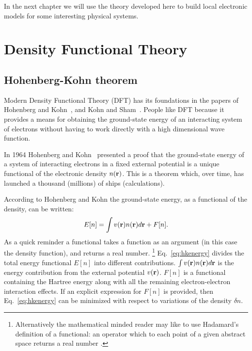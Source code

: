 In the next chapter we will use the theory developed here
to build local electronic models for some interesting 
physical systems.

\section{Density Functional Theory}
\subsection{Hohenberg-Kohn theorem}
\label{sec:hohnkohn}
Modern Density Functional Theory (DFT) has its foundations in the 
papers of Hohenberg and Kohn~\cite{hohenbergkohn64}, and Kohn and Sham~\cite{kohnsham65}.
People like DFT because it provides a means for obtaining the ground-state energy of an
interacting system of electrons without having to work directly with a high dimensional
wave function.

In 1964 Hohenberg and Kohn~\cite{hohenbergkohn64} presented a proof 
that the ground-state energy of a system of interacting electrons
in a fixed external potential is a unique functional of the 
electronic density $n({\bf r})$. This is a theorem which, over time,
has launched a thousand (millions) of ships (calculations).

According to Hohenberg and Kohn the ground-state energy, as a 
functional of the density, can be written:
%
\begin{equation}
\label{eq:hkenergy}
E[n] = \int v({\bf r}) n({\bf r})d{\bf r} + F[n].
\end{equation}
%
As a quick reminder a functional takes a function as an argument (in this case the density function),
and returns a real number. \footnote{Alternatively the mathematical minded reader may like to use Hadamard's definition of a functional: an
operator which to each point of a given abstract space returns a real number \cite{leray38}.}
Eq.~\ref{eq:hkenergy} divides the total energy functional $E[n]$ into different contributions.
$\int v({\bf r})n({\bf r})d{\bf r}$ is the energy contribution from the external potential $v({\bf r})$. $F[n]$ 
is a functional containing the Hartree energy along with all
the remaining electron-electron interaction effects.
%
If an explicit expression for $F[n]$ is provided, then 
Eq.~\ref{eq:hkenergy} can be minimized with respect 
to variations of the density $\delta n$.

